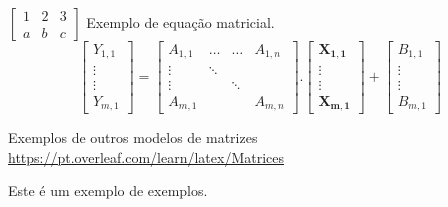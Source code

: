         $ %
        \begin{bmatrix}
            1 & 2 & 3\\
            a & b & c
        \end{bmatrix}
        $
            Exemplo de equação matricial.
            \begin{equation}
                \begin{bmatrix}
                    Y_{1,1}\\ 
                    \vdots \\   
                    \vdots \\ 
                    Y_{m,1}
                \end{bmatrix}
                =\begin{bmatrix}
                    A_{1,1} & \ldots & \ldots & A_{1,n}\\ 
                    \vdots & \ddots &  & \\   
                    \vdots &  & \ddots  & \\ 
                    A_{m,1}&  &  & A_{m,n}
                \end{bmatrix}
                .\begin{bmatrix}
                    \mathbf{X_{1,1}} \\  %
                    \mathbf{\vdots} \\   
                    \mathbf{\vdots} \\ 
                    \mathbf{X_{m,1}}
                \end{bmatrix}
                +\begin{bmatrix}
                    B_{1,1} \\ 
                    \vdots \\   
                    \vdots \\ 
                    B_{m,1}
                \end{bmatrix}
            \end{equation}


        Exemplos de outros modelos de matrizes 
        \url{https://pt.overleaf.com/learn/latex/Matrices}
      

      


        Este é um exemplo de exemplos.
        
